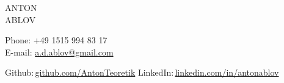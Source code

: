 \documentclass[9pt]{developercv} %
\begin{document}

\begin{minipage}[t]{0.45\textwidth} %
	\vspace{-\baselineskip} %
	

	\Huge{ANTON \\ABLOV}
	
	\vspace{6pt}
	
\end{minipage}
\begin{minipage}[t]{0.275\textwidth} %
	\vspace{-\baselineskip} %
	
	Phone: +49 1515 994 83 17\\
	E-mail:  {\href{mailto:a.d.ablov@gmail.com}{a.d.ablov@gmail.com}}\\	
\end{minipage}
\begin{minipage}[t]{0.275\textwidth} %
	\vspace{-\baselineskip} %
	
	Github:\,\href{https://github.com/AntonTeoretik}{github.com/AntonTeoretik}
	LinkedIn:\,\href{https://www.linkedin.com/in/antonablov/}{linkedin.com/in/antonablov}
	
\end{minipage}
\end{document}
